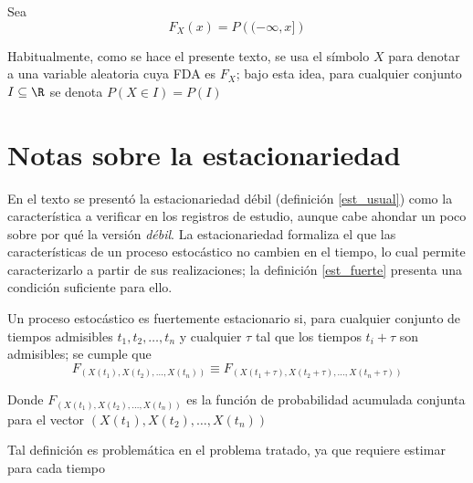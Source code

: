 \begin{defn}
Sea 
\begin{equation*}
F_X (x) = P\left( (-\infty,x] \right)
\end{equation*}
\end{defn}

Habitualmente, como se hace el presente texto, se usa el símbolo $X$ para denotar a una variable 
aleatoria cuya FDA es $F_X$; bajo esta idea, para cualquier conjunto $I \subseteq \R$ se denota
$P(X \in I) = P(I)$


\section{Notas sobre la estacionariedad}

En el texto se presentó la estacionariedad débil (definición \ref{est_usual}) como la característica
a verificar en los registros de estudio, aunque cabe ahondar un poco sobre por qué
la versión \textit{débil}. La estacionariedad formaliza el que
las características de un proceso estocástico no cambien en el tiempo, lo cual permite 
caracterizarlo a partir de sus realizaciones; la definición \ref{est_fuerte} presenta
una condición suficiente para ello.

\begin{defn}
Un proceso estoc\'astico \xt es fuertemente estacionario si, para cualquier conjunto de 
tiempos admisibles
$t_1,t_2,\dots,t_n$ y cualquier $\tau$ tal que los tiempos $t_i+\tau$ son admisibles; se cumple que
\begin{equation*}
F_{\left(X(t_1),X(t_2),\dots,X(t_n)\right) }
\equiv
F_{\left(X(t_1+\tau),X(t_2+\tau),\dots,X(t_n+\tau)\right)}
\end{equation*}

Donde $F_{\left(X(t_1),X(t_2),\dots,X(t_n)\right) }$ es la funci\'on de probabilidad acumulada 
conjunta para el vector $\left(X(t_1),X(t_2),\dots,X(t_n)\right)$
\label{est_fuerte}
\end{defn}

Tal definición es problemática en el problema tratado, ya que requiere estimar para cada tiempo


